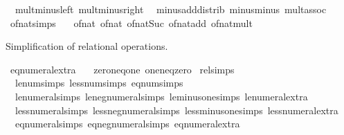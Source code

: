 \begin{isabellebody}
\ \ mult{\isacharunderscore}{\kern0pt}minus{\isacharunderscore}{\kern0pt}left\ mult{\isacharunderscore}{\kern0pt}minus{\isacharunderscore}{\kern0pt}right\isanewline
\ \ minus{\isacharunderscore}{\kern0pt}add{\isacharunderscore}{\kern0pt}distrib\ minus{\isacharunderscore}{\kern0pt}minus\ mult{\isachardot}{\kern0pt}assoc\isanewline
\isanewline
{}\isamarkupfalse%
\ of{\isacharunderscore}{\kern0pt}nat{\isacharunderscore}{\kern0pt}simps\ {\isacharequal}{\kern0pt}\isanewline
\ \ of{\isacharunderscore}{\kern0pt}nat{\isacharunderscore}{\kern0pt}{}\ of{\isacharunderscore}{\kern0pt}nat{\isacharunderscore}{\kern0pt}{}\ of{\isacharunderscore}{\kern0pt}nat{\isacharunderscore}{\kern0pt}Suc\ of{\isacharunderscore}{\kern0pt}nat{\isacharunderscore}{\kern0pt}add\ of{\isacharunderscore}{\kern0pt}nat{\isacharunderscore}{\kern0pt}mult%
\begin{isamarkuptext}%
Simplification of relational operations.%
\end{isamarkuptext}\isamarkuptrue%
\isamarkupfalse%
\ eq{\isacharunderscore}{\kern0pt}numeral{\isacharunderscore}{\kern0pt}extra\ {\isacharequal}{\kern0pt}\isanewline
\ \ zero{\isacharunderscore}{\kern0pt}neq{\isacharunderscore}{\kern0pt}one\ one{\isacharunderscore}{\kern0pt}neq{\isacharunderscore}{\kern0pt}zero\isanewline
\isanewline
{}\isamarkupfalse%
\ rel{\isacharunderscore}{\kern0pt}simps\ {\isacharequal}{\kern0pt}\isanewline
\ \ le{\isacharunderscore}{\kern0pt}num{\isacharunderscore}{\kern0pt}simps\ less{\isacharunderscore}{\kern0pt}num{\isacharunderscore}{\kern0pt}simps\ eq{\isacharunderscore}{\kern0pt}num{\isacharunderscore}{\kern0pt}simps\isanewline
\ \ le{\isacharunderscore}{\kern0pt}numeral{\isacharunderscore}{\kern0pt}simps\ le{\isacharunderscore}{\kern0pt}neg{\isacharunderscore}{\kern0pt}numeral{\isacharunderscore}{\kern0pt}simps\ le{\isacharunderscore}{\kern0pt}minus{\isacharunderscore}{\kern0pt}one{\isacharunderscore}{\kern0pt}simps\ le{\isacharunderscore}{\kern0pt}numeral{\isacharunderscore}{\kern0pt}extra\isanewline
\ \ less{\isacharunderscore}{\kern0pt}numeral{\isacharunderscore}{\kern0pt}simps\ less{\isacharunderscore}{\kern0pt}neg{\isacharunderscore}{\kern0pt}numeral{\isacharunderscore}{\kern0pt}simps\ less{\isacharunderscore}{\kern0pt}minus{\isacharunderscore}{\kern0pt}one{\isacharunderscore}{\kern0pt}simps\ less{\isacharunderscore}{\kern0pt}numeral{\isacharunderscore}{\kern0pt}extra\isanewline
\ \ eq{\isacharunderscore}{\kern0pt}numeral{\isacharunderscore}{\kern0pt}simps\ eq{\isacharunderscore}{\kern0pt}neg{\isacharunderscore}{\kern0pt}numeral{\isacharunderscore}{\kern0pt}simps\ eq{\isacharunderscore}{\kern0pt}numeral{\isacharunderscore}{\kern0pt}extra\isanewline

\end{isabellebody}
